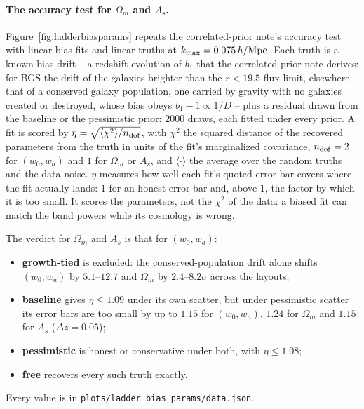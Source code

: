 \documentclass[11pt]{article}
\newcommand{\kmax}{k_{\rm max}}
\newcommand{\hMpc}{\,h/{\rm Mpc}}
\newcommand{\chidof}{\sqrt{\langle\chi^2\rangle/n_{\rm dof}}}
\begin{document}
\paragraph{The accuracy test for $\Omega_m$ and $A_s$.}
Figure~\ref{fig:ladderbiasparams} repeats the correlated-prior note's
accuracy test with linear-bias fits and linear truths at
$\kmax = 0.075\hMpc$.  Each truth is a known bias drift -- a
redshift evolution of $b_1$ that the correlated-prior note derives:
for BGS the drift of the galaxies brighter than the $r < 19.5$ flux
limit, elsewhere that of a conserved galaxy population, one carried
by gravity with no galaxies created or destroyed, whose bias obeys
$b_1 - 1 \propto 1/D$ -- plus a residual drawn from the baseline or
the pessimistic
prior: $2000$ draws, each fitted under every prior.  A fit is scored
by $\eta = \chidof$, with $\chi^2$ the squared distance of the
recovered parameters from the truth in units of the fit's
marginalized covariance, $n_{\rm dof} = 2$ for $(w_0, w_a)$ and $1$
for $\Omega_m$ or $A_s$, and $\langle\cdot\rangle$ the average over
the random truths and the data noise.  $\eta$ measures how well each
fit's quoted error bar covers where the fit actually lands: $1$ for an
honest error bar and, above $1$, the factor by which it is too small.
It scores the parameters, not the $\chi^2$ of the data: a biased fit
can match the band powers while its cosmology is wrong.

The verdict for $\Omega_m$ and $A_s$ is that for $(w_0, w_a)$:
\begin{itemize}
  \item \textbf{growth-tied} is excluded: the conserved-population
    drift alone shifts $(w_0, w_a)$ by $5.1$--$12.7$ and $\Omega_m$ by
    $2.4$--$8.2\sigma$ across the layouts;
  \item \textbf{baseline} gives $\eta \le 1.09$ under its own scatter,
    but under pessimistic scatter its error bars are too small by up
    to $1.15$ for $(w_0, w_a)$, $1.24$ for $\Omega_m$ and $1.15$ for
    $A_s$ ($\Delta z = 0.05$);
  \item \textbf{pessimistic} is honest or conservative under both,
    with $\eta \le 1.08$;
  \item \textbf{free} recovers every such truth exactly.
\end{itemize}
Every value is in \texttt{plots/ladder\_bias\_params/data.json}.
\end{document}
